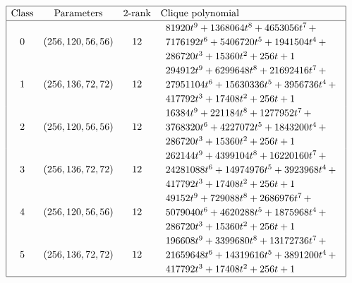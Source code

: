 \begin{table}[!bhpt] %
%
\small{}
\begin{align*}
\def\arraystretch{1.2}
\begin{array}{|cccl|}
\hline
\text{Class} &
\text{Parameters} &
\text{2-rank} &
\text{Clique polynomial}
\\
\hline
0 &
(256, 120, 56, 56) &
12 &
\begin{array}{l}
81920t^{9} + 1368064t^{8} + 4653056t^{7}
\,+
\\
 7176192t^{6} + 5406720t^{5} + 1941504t^{4}
\,+
\\
 286720t^{3} + 15360t^{2} + 256t + 1
\end{array}
\\
1 &
(256, 136, 72, 72) &
12 &
\begin{array}{l}
294912t^{9} + 6299648t^{8} + 21692416t^{7}
\,+
\\
 27951104t^{6} + 15630336t^{5} + 3956736t^{4}
\,+
\\
 417792t^{3} + 17408t^{2} + 256t + 1
\end{array}
\\
2 &
(256, 120, 56, 56) &
12 &
\begin{array}{l}
16384t^{9} + 221184t^{8} + 1277952t^{7}
\,+
\\
 3768320t^{6} + 4227072t^{5} + 1843200t^{4}
\,+
\\
 286720t^{3} + 15360t^{2} + 256t + 1
\end{array}
\\
3 &
(256, 136, 72, 72) &
12 &
\begin{array}{l}
262144t^{9} + 4399104t^{8} + 16220160t^{7}
\,+
\\
 24281088t^{6} + 14974976t^{5} + 3923968t^{4}
\,+
\\
 417792t^{3} + 17408t^{2} + 256t + 1
\end{array}
\\
4 &
(256, 120, 56, 56) &
12 &
\begin{array}{l}
49152t^{9} + 729088t^{8} + 2686976t^{7}
\,+
\\
 5079040t^{6} + 4620288t^{5} + 1875968t^{4}
\,+
\\
 286720t^{3} + 15360t^{2} + 256t + 1
\end{array}
\\
5 &
(256, 136, 72, 72) &
12 &
\begin{array}{l}
196608t^{9} + 3399680t^{8} + 13172736t^{7}
\,+
\\
 21659648t^{6} + 14319616t^{5} + 3891200t^{4}
\,+
\\
 417792t^{3} + 17408t^{2} + 256t + 1
\end{array}
\\
\hline
\end{array}
\end{align*}
%
\caption{$[f_{8,3}]$ extended Cayley classes.}
\label{tab-c8_3_EC_classes}
\end{table}

